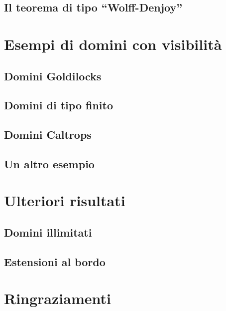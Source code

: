 \documentclass{article}
\begin{document}
\subsection{Il teorema di tipo ``Wolff-Denjoy''}


\newpage

\section{Esempi di domini con visibilità} \label{Esempi di domini con visibilità}

\subsection{Domini Goldilocks}

\subsection{Domini di tipo finito}

\subsection{Domini Caltrops}

\subsection{Un altro esempio}


\newpage

\section{Ulteriori risultati} \label{Ulteriori risultati}
\subsection{Domini illimitati}

\subsection{Estensioni al bordo}


\newpage



\newpage

\section*{Ringraziamenti}

\end{document}
